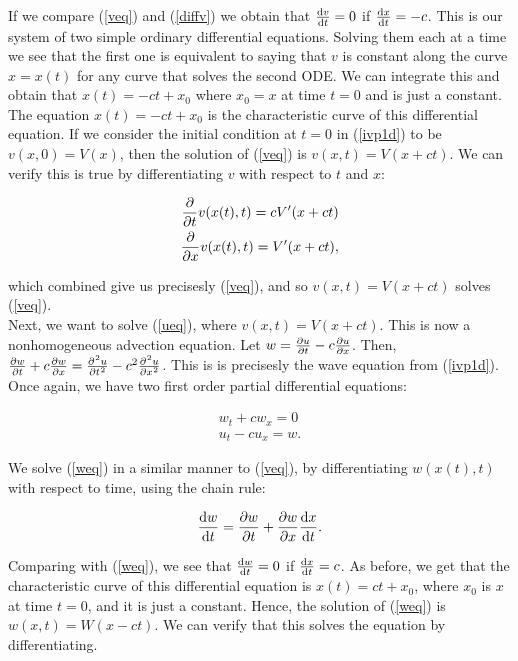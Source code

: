 \documentclass[a4paper, 12pt]{article}
\numberwithin{equation}{section}
\begin{document}
If we compare (\ref{veq}) and (\ref{diffv}) we obtain that $\diff{v}{t}=0$ if $\diff{x}{t}=-c$. This is our system of two simple ordinary differential 
equations. Solving them each at a time we see that the first one is equivalent to saying that $v$ is constant along the curve $x=x(t)$ for any curve that 
solves the second ODE. We can integrate this and obtain that $x(t)=-ct+x_0$ where $x_0=x$ at time $t=0$ and is just a constant. The equation $x(t)=-ct+x_0$
is the characteristic curve of this differential equation. If we consider the initial condition at $t=0$ in (\ref{ivp1d}) to be $v(x,0)=V(x)$, then the 
solution of (\ref{veq}) is $v(x,t)=V(x+ct)$. We can verify this is true by differentiating $v$ with respect to $t$ and $x$:

\begin{equation*}
    \begin{aligned}
    \diffp[1]{}{t}v(x(t), t)=cV'(x+ct)\\
    \diffp[1]{}{x}v(x(t), t)=V'(x+ct),
    \end{aligned}
\end{equation*}

which combined give us precisesly (\ref{veq}), and so $v(x,t)=V(x+ct)$ solves (\ref{veq}).
\\

Next, we want to solve (\ref{ueq}), where $v(x,t)=V(x+ct)$. This is now a nonhomogeneous advection equation. Let $w=\diffp[1]{u}{t}-c\diffp{u}{x}$. Then, 
$\diffp[1]{w}{t}+c\diffp{w}{x}=\diffp[2]{u}{t}-c^2\diffp[2]{u}{x}$. This is is precisesly the wave equation from (\ref{ivp1d}). Once again, we have two first
order partial differential equations:

\begin{align}
    \label{weq}
    w_t+cw_x=0\\
    \label{ueqw}
    u_t-cu_x=w.
\end{align}

We solve (\ref{weq}) in a similar manner to (\ref{veq}), by differentiating $w(x(t),t)$ with respect to time, using the chain rule:

\begin{equation} \label{diffw}
    \diff{w}{t}=\diffp[1]{w}{t}+\diffp[1]{w}{x}\diff{x}{t}. 
\end{equation}

Comparing with (\ref{weq}), we see that $\diff{w}{t}=0$ if $\diff{x}{t}=c$. As before, we get that the characteristic 
curve of this differential equation is $x(t)=ct+x_0$, where $x_0$ is $x$ at time $t=0$, and it is just a constant. Hence, the solution of (\ref{weq})
is $w(x,t)=W(x-ct)$. We can verify that this solves the equation by differentiating.
\\
\end{document}
